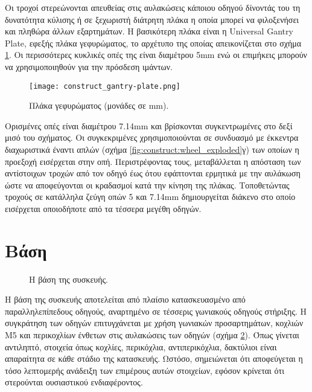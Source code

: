 Οι τροχοί στερεώνονται απευθείας στις αυλακώσεις κάποιου οδηγού δίνοντάς του τη
δυνατότητα κύλισης ή σε ξεχωριστή διάτρητη πλάκα η οποία μπορεί να φιλοξενήσει
και πληθώρα άλλων εξαρτημάτων. Η βασικότερη πλάκα είναι η Universal Gantry
Plate, εφεξής πλάκα γεφυρώματος, το αρχέτυπο της οποίας απεικονίζεται στο σχήμα
\ref{fig:construct:gantry-plate}. Οι περισσότερες κυκλικές οπές της είναι
διαμέτρου 5mm ενώ οι επιμήκεις μπορούν να χρησιμοποιηθούν για την πρόσδεση
ιμάντων.

\begin{figure}
    \caption[Πλάκα γεφυρώματος]{Πλάκα γεφυρώματος (μονάδες σε mm).
    \label{fig:construct:gantry-plate}}
    \begin{center}%
    \texttt{[image: construct\_gantry-plate.png]}%
    \end{center}

\end{figure}

Ορισμένες οπές είναι διαμέτρου 7.14mm και βρίσκονται συγκεντρωμένες στο δεξί
μισό του σχήματος.
Οι συγκεκριμένες χρησιμοποιούνται σε συνδυασμό με έκκεντρα διαχωριστικά έναντι
απλών (σχήμα \ref{fig:construct:wheel_exploded}γ) των οποίων η προεξοχή
εισέρχεται στην οπή. Περιστρέφοντας τους, μεταβάλλεται η απόσταση των
αντίστοιχων τροχών από τον οδηγό έως ότου εφάπτονται ερμητικά με την αυλάκωση
ώστε να αποφεύγονται οι κραδασμοί κατά την κίνηση της πλάκας.
Τοποθετώντας τροχούς σε κατάλληλα ζεύγη οπών 5 και 7.14mm δημιουργείται διάκενο
στο οποίο εισέρχεται οποιοδήποτε από τα τέσσερα μεγέθη οδηγών.




\section{Βάση}
\label{sec:construct:base}

\begin{figure}
    \caption{Η βάση της συσκευής. \label{fig:construct:base}}
    \begin{center}%
    \def\svgwidth{\textwidth}
    
    \end{center}
\end{figure}

Η βάση της συσκευής αποτελείται από πλαίσιο κατασκευασμένο από παραλληλεπίπεδους
οδηγούς, αναρτημένο σε τέσσερις γωνιακούς οδηγούς στήριξης. Η συγκράτηση των
οδηγών επιτυγχάνεται με χρήση γωνιακών προσαρτημάτων, κοχλιών M5 και περικοχλίων
ένθετων στις αυλακώσεις των οδηγών (σχήμα \ref{fig:construct:base}). Όπως
γίνεται αντιληπτό, στοιχεία όπως κοχλίες, περικόχλια, αντιπερικόχλια, δακτύλιοι
 είναι απαραίτητα σε κάθε στάδιο της κατασκευής. Ωστόσο, σημειώνεται ότι
αποφεύγεται η τόσο λεπτομερής ανάδειξη των επιμέρους αυτών στοιχείων, εφόσον
κρίνεται ότι στερούνται ουσιαστικού ενδιαφέροντος.

